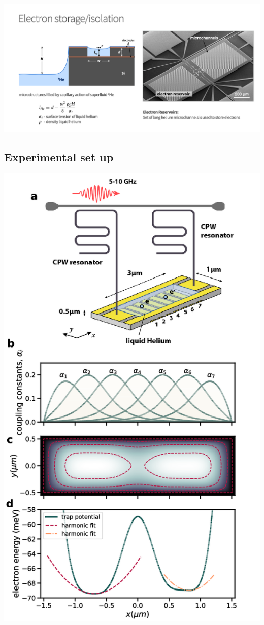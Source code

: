 \documentclass[%
oneside,                 %
final,                   %
10pt]{article}
\begin{document}
\vspace{6mm}

\centerline{\includegraphics[width=1.3\linewidth]{qcfigures/Elhelium3.png}}

\vspace{6mm}

\subsection{Experimental set up}

\vspace{6mm}

\centerline{\includegraphics[width=0.7\linewidth]{qcfigures/figure1.png}}
\end{document}
